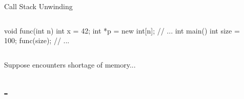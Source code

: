 \documentclass{beamer}
\begin{document}
\begin{frame}[fragile]{Call Stack Unwinding}
    \begin{columns}
        \begin{column}{0.5\textwidth}
            \begin{cpp}
void func(int n) {
  int x = 42;
  int *p = new int[n];
  // ...
}
int main() {
  int size = 100;
  func(size);
  // ...
}
            \end{cpp}
        \end{column}
        \begin{column}{0.5\textwidth}
        \end{column}
    \end{columns}
    Suppose \ttt{[]} encounters shortage of memory...
\end{frame}

\subsection{-}
\end{document}
